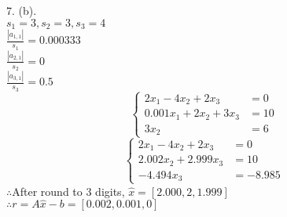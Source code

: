 \documentclass[a4paper]{article}
\begin{document}
7. (b).\\
$s_1=3, s_2=3, s_3=4$\\
$\frac{|a_{1, 1}|}{s_1}=0.000333$\\
$\frac{|a_{2, 1}|}{s_2}=0$\\
$\frac{|a_{3, 1}|}{s_3}=0.5$\\
\begin{equation}
  \left\{
   \begin{aligned}
       2x_1-4x_2+2x_3 &= 0\\
       0.001x_1+2x_2+3x_3 &=10\\
       3x_2 &= 6
   \end{aligned}
  \right.
\end{equation}
\begin{equation}
  \left\{
   \begin{aligned}
       2x_1-4x_2+2x_3 &= 0\\
       2.002x_2 + 2.999x_3 &= 10 \\
       -4.494x_3 &= -8.985
   \end{aligned}
  \right.
\end{equation}
$\therefore $After round to 3 digits, $\hat{x} = [2.000, 2, 1.999]$\\
$\therefore r=A\hat{x}-b=[0.002, 0.001, 0]$\\
\end{document}
